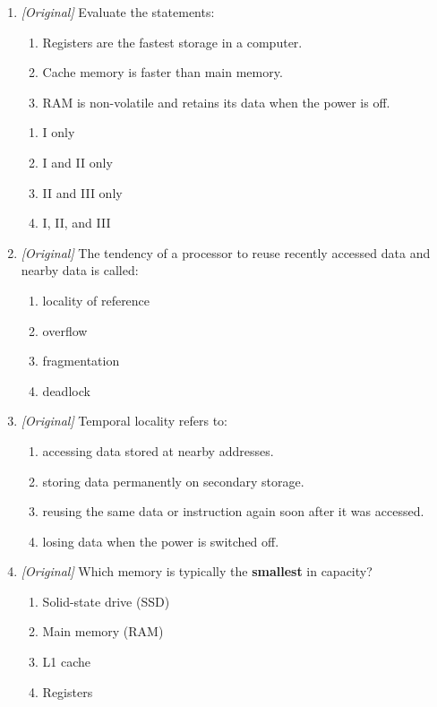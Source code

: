 \begin{enumerate}[label=\textbf{Q\arabic*.}, leftmargin=*]
\begin{enumerate}[label=\Alph*.]
  \end{enumerate}
\item \textit{[Original]} Evaluate the statements:
  \begin{enumerate}[label=\Roman*.]
    \item Registers are the fastest storage in a computer.
    \item Cache memory is faster than main memory.
    \item RAM is non-volatile and retains its data when the power is off.
  \end{enumerate}
  \begin{enumerate}[label=\Alph*.]
    \item I only
    \item I and II only
    \item II and III only
    \item I, II, and III
  \end{enumerate}
\item \textit{[Original]} The tendency of a processor to reuse recently
  accessed data and nearby data is called:
  \begin{enumerate}[label=\Alph*.]
    \item locality of reference
    \item overflow
    \item fragmentation
    \item deadlock
  \end{enumerate}
\item \textit{[Original]} Temporal locality refers to:
  \begin{enumerate}[label=\Alph*.]
    \item accessing data stored at nearby addresses.
    \item storing data permanently on secondary storage.
    \item reusing the same data or instruction again soon after it was
      accessed.
    \item losing data when the power is switched off.
  \end{enumerate}
\item \textit{[Original]} Which memory is typically the \textbf{smallest} in
  capacity?
  \begin{enumerate}[label=\Alph*.]
    \item Solid-state drive (SSD)
    \item Main memory (RAM)
    \item L1 cache
    \item Registers

\end{enumerate}
\end{enumerate}
